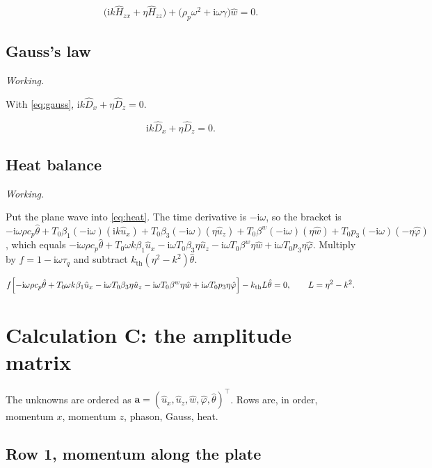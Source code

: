 \documentclass[11pt,a4paper]{article}
\newif\ifshowworked \showworkedtrue
\newenvironment{worked}{\ifshowworked\par\smallskip\noindent\textit{Working.}\par\else\setbox0\vbox\bgroup\fi}{\ifshowworked\par\smallskip\else\egroup\fi}
\newcommand{\ii}{\mathrm{i}}
\newcommand{\bx}{\hat u_x}
\newcommand{\bz}{\hat u_z}
\newcommand{\bw}{\hat w}
\newcommand{\bp}{\hat\varphi}
\newcommand{\bt}{\hat\theta}
\newcommand{\kB}{k_{\mathrm{th}}}
\newcommand{\bwth}{\beta^{w}}
\begin{document}
\noindent
\begin{equation}\label{eq:g2}
\bigl(\ii k\hat H_{zx}+\eta\hat H_{zz}\bigr)+\bigl(\rho_p\omega^2+\ii\omega\gamma\bigr)\bw=0 .
\end{equation}

\subsection{Gauss's law}

\begin{worked}
With \eqref{eq:gauss}, $\ii k\hat D_x+\eta\hat D_z=0$.
\end{worked}

\noindent
\begin{equation}\label{eq:g3}
\ii k\hat D_x+\eta\hat D_z=0 .
\end{equation}

\subsection{Heat balance}

\begin{worked}
Put the plane wave into \eqref{eq:heat}. The time derivative is $-\ii\omega$, so the bracket is
$-\ii\omega\rho c_p\bt+T_0\beta_1(-\ii\omega)(\ii k\bx)+T_0\beta_3(-\ii\omega)(\eta\bz)
+T_0\bwth(-\ii\omega)(\eta\bw)+T_0p_3(-\ii\omega)(-\eta\bp)$, which equals
$-\ii\omega\rho c_p\bt+T_0\omega k\beta_1\bx-\ii\omega T_0\beta_3\eta\bz-\ii\omega T_0\bwth\eta\bw
+\ii\omega T_0p_3\eta\bp$. Multiply by $f=1-\ii\omega\tau_q$ and subtract $\kB(\eta^2-k^2)\bt$.
\end{worked}

\noindent
\begin{equation}\label{eq:g4}
f\Bigl[-\ii\omega\rho c_p\bt+T_0\omega k\beta_1\bx-\ii\omega T_0\beta_3\eta\bz
-\ii\omega T_0\bwth\eta\bw+\ii\omega T_0p_3\eta\bp\Bigr]-\kB L\bt=0,\qquad L=\eta^2-k^2 .
\end{equation}

\section{Calculation C: the amplitude matrix}\label{sec:C}

The unknowns are ordered as $\mathbf a=(\bx,\bz,\bw,\bp,\bt)^{\top}$. Rows are, in order, momentum $x$,
momentum $z$, phason, Gauss, heat.

\subsection{Row 1, momentum along the plate}
\end{document}
